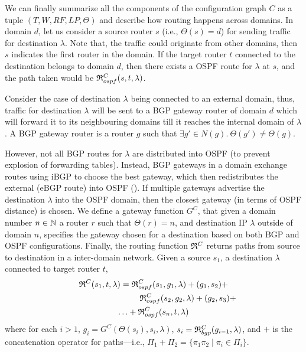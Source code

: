 

We can finally summarize all the components of the configuration graph $C$
as a tuple $(T, W,RF,LP,\Theta)$ and describe how routing happens across domains.
In domain $d$, let us consider a source router $s$ (i.e., $\Theta(s) = d$) for 
sending traffic for destination $\lambda$. Note that, the traffic
could originate from other domains, then $s$ indicates the first
router in the domain.  If the target router $t$ 
connected to the destination belongs to domain $d$, then there exists
a OSPF route for $\lambda$ at $s$, and the path taken would be 
$\mathfrak{R}_{ospf}^C(s,t,\lambda)$.

Consider the case of destination $\lambda$ being connected 
to an external domain, thus, traffic for destination $\lambda$
will be sent to a BGP gateway router of domain $d$ which 
will forward it to its neighbouring domains till
it reaches the internal domain of $\lambda$. A BGP gateway
router is a router $g$ such that $\exists g' \in N(g). 
~\Theta(g') \not= \Theta(g)$. 

However, not all BGP routes for $\lambda$
are distributed 
into OSPF (to prevent explosion of forwarding tables). Instead,
BGP gateways in a domain exchange routes using iBGP to choose
the best gateway, which then redistributes the external
(eBGP route) into OSPF (). If multiple
gateways advertise the destination $\lambda$ into the OSPF 
domain, then the closest gateway (in terms of OSPF distance)
is chosen. We define a gateway function $G^C$,
that given a domain number $n\in \mathbb{N}$
a router $r$ such that $\Theta(r)=n$,
and destination IP $\lambda$ outside of domain $n$, specifies the
gateway chosen for a destination based on both BGP and OSPF
configurations. 
Finally, the routing function 
$\mathfrak{R}^C$
returns paths from source to destination in a inter-domain network. 
Given a source $s_1$, a destination $\lambda$ connected to target router $t$, 
\begin{multline}
	\mathfrak{R}^C(s_1, t, \lambda) = 
	\mathfrak{R}_{ospf}^C(s_1,g_1, \lambda) + 
	 (g_1, s_2 )+ \\
	~~~~~~~~~~~~~~~~~~~~~~~~~\mathfrak{R}_{ospf}^C(s_2,g_2, \lambda) + (g_2, s_3) + \\
	\ldots  +\mathfrak{R}_{ospf}^C(s_n,t,\lambda)
\end{multline}
where for each $i>1$, $g_i=G^C(\Theta(s_i),s_i,\lambda)$, 
$s_i=\mathfrak{R}_{bgp}^C(g_{i-1}, \lambda)$,
and  $+$ is the concatenation operator for paths---i.e.,
$\Pi_1+\Pi_2=\{\pi_1\pi_2\mid \pi_i\in\Pi_i\}$.

